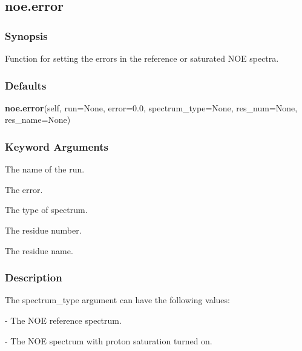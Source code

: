 




\newpage

\subsection{noe.error}


\subsubsection{Synopsis}

Function for setting the errors in the reference or saturated NOE spectra.

\subsubsection{Defaults}

\textsf{\textbf{noe.error}(self, run=None, error=0.0, spectrum\_type=None, res\_num=None, res\_name=None)}


\subsubsection{Keyword Arguments}


  The name of the run.

  The error.

  The type of spectrum.

  The residue number.

  The residue name.

\subsubsection{Description}

The spectrum\_type argument can have the following values:
    
 - The NOE reference spectrum.
    
 - The NOE spectrum with proton saturation turned on.

